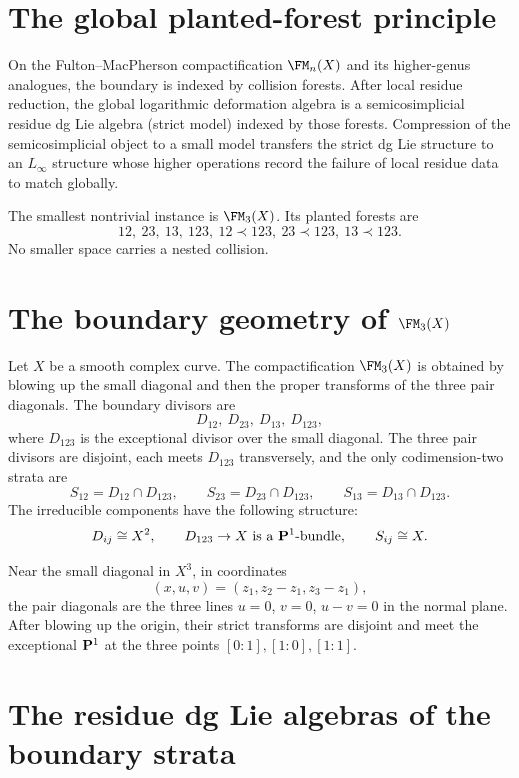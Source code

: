 \section{The global planted-forest principle}

On the Fulton--MacPherson compactification $\FM_n(X)$ and its higher-genus
analogues, the boundary is indexed by collision forests. After local residue
reduction, the global logarithmic deformation algebra is a semicosimplicial
residue dg Lie algebra (strict model) indexed by those forests. Compression of
the semicosimplicial object to a small model transfers the strict dg Lie
structure to an $L_\infty$ structure whose higher operations record the failure
of local residue data to match globally.

The smallest nontrivial instance is $\FM_3(X)$. Its planted forests are
\[
12,\ 23,\ 13,\ 123,\ 12\prec 123,\ 23\prec 123,\ 13\prec 123.
\]
No smaller space carries a nested collision.

\section{The boundary geometry of \texorpdfstring{$\FM_3(X)$}{FM3(X)}}

Let $X$ be a smooth complex curve.
The compactification $\FM_3(X)$ is obtained by blowing up the small diagonal and
then the proper transforms of the three pair diagonals. The boundary divisors
are
\[
D_{12},\ D_{23},\ D_{13},\ D_{123},
\]
where $D_{123}$ is the exceptional divisor over the small diagonal. The three
pair divisors are disjoint, each meets $D_{123}$ transversely, and the only
codimension-two strata are
\[
S_{12}=D_{12}\cap D_{123},\qquad
S_{23}=D_{23}\cap D_{123},\qquad
S_{13}=D_{13}\cap D_{123}.
\]
The irreducible components have the following structure:
\[
D_{ij}\cong X^2,
\qquad
D_{123}\to X \text{ is a }\mathbf P^1\text{-bundle},
\qquad
S_{ij}\cong X.
\]

Near the small diagonal in $X^3$, in coordinates
\[
(x,u,v)=(z_1,z_2-z_1,z_3-z_1),
\]
the pair diagonals are the three lines $u=0$, $v=0$, $u-v=0$ in the normal
plane. After blowing up the origin, their strict transforms are disjoint and
meet the exceptional $\mathbf P^1$ at the three points $[0:1],[1:0],[1:1]$.

\section{The residue dg Lie algebras of the boundary strata}

